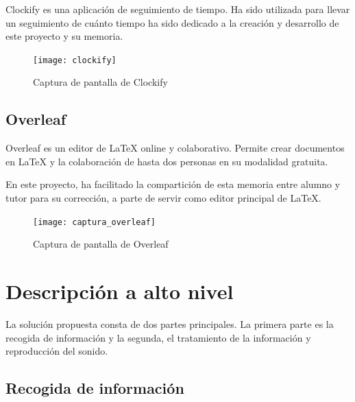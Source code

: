             Clockify es una aplicación de seguimiento de tiempo. Ha sido utilizada para llevar un seguimiento de cuánto
            tiempo ha sido dedicado a la creación y desarrollo de este proyecto y su memoria.

            \begin{figure}[ht]
                \centering
                \texttt{[image: clockify]}
                \caption{Captura de pantalla de Clockify \label{fig:ClockifyCaptura}}
            \end{figure}


        \subsection{Overleaf} %
        \label{sub:Overleaf}

            Overleaf es un editor de LaTeX online y colaborativo. Permite crear documentos en LaTeX y la colaboración de
            hasta dos personas en su modalidad gratuita.

            En este proyecto, ha facilitado la compartición de esta memoria entre alumno y tutor para su corrección, a
            parte de servir como editor principal de LaTeX.

            \begin{figure}[ht]
                \centering
                \texttt{[image: captura\_overleaf]}
                \caption{Captura de pantalla de Overleaf \label{fig:OverleafCaptura}}
            \end{figure}



    \section{Descripción a alto nivel} %
    \label{sec:DescripcionAAltoNivel}

        La solución propuesta consta de dos partes principales. La primera parte es la recogida de información y la
        segunda, el tratamiento de la información y reproducción del sonido.

        \subsection{Recogida de información} %
        \label{sub:RecogidaDeInformacion}

